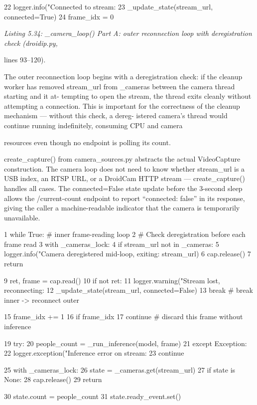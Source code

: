 22 logger.info("Connected to stream: %
23 \_update\_state(stream\_url, connected=True)
24 frame\_idx = 0


\textit{Listing 5.34: \_camera\_loop() Part A: outer reconnection loop with deregistration check (droidip.py,}

lines 93--120).


The outer reconnection loop begins with a deregistration check: if the cleanup worker
has removed stream\_url from \_cameras between the camera thread starting and it at-
tempting to open the stream, the thread exits cleanly without attempting a connection. This
is important for the correctness of the cleanup mechanism --- without this check, a dereg-
istered camera's thread would continue running indeﬁnitely, consuming CPU and camera



resources even though no endpoint is polling its count.

create\_capture() from camera\_sources.py abstracts the actual VideoCapture
construction. The camera loop does not need to know whether stream\_url is a USB index,
an RTSP URL, or a DroidCam HTTP stream --- create\_capture() handles all cases. The
connected=False state update before the 3-second sleep allows the /current-count
endpoint to report ``connected: false'' in its response, giving the caller a machine-readable
indicator that the camera is temporarily unavailable.

1 while True: \# inner frame-reading loop
2 \# Check deregistration before each frame read
3 with \_cameras\_lock:
4 if stream\_url not in \_cameras:
5 logger.info("Camera deregistered mid-loop, exiting: %
stream\_url)
6 cap.release()
7 return

9 ret, frame = cap.read()
10 if not ret:
11 logger.warning("Stream lost, reconnecting: %
12 \_update\_state(stream\_url, connected=False)
13 break \# break inner -> reconnect outer

15 frame\_idx += 1
16 if frame\_idx %
17 continue \# discard this frame without inference


19 try:
20 people\_count = \_run\_inference(model, frame)
21 except Exception:
22 logger.exception("Inference error on stream: %
23 continue

25 with \_cameras\_lock:
26 state = \_cameras.get(stream\_url)
27 if state is None:
28 cap.release()
29 return




30 state.count = people\_count
31 state.ready\_event.set()


